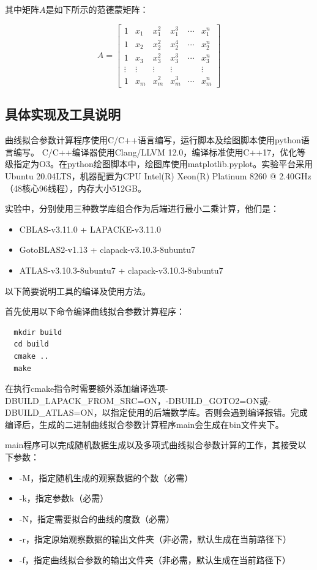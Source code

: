 \documentclass[a4paper]{article}
\begin{document}
其中矩阵$A$是如下所示的范德蒙矩阵：

\begin{equation*}
  A=
  \begin{bmatrix}
    1 & x_1 & x_1^2 & x_1^3 & \cdots & x_1^n \\
    1 & x_2 & x_2^2 & x_2^4 & \cdots & x_2^n \\
    1 & x_3 & x_3^2 & x_3^3 & \cdots & x_3^n \\
    \vdots & \vdots & \vdots & \vdots & & \vdots \\
    1 & x_m & x_m^2 &x_m^3 & \cdots & x_m^n
  \end{bmatrix}
\end{equation*}

\subsection{具体实现及工具说明}
曲线拟合参数计算程序使用C/C++语言编写，运行脚本及绘图脚本使用python语言编写。
C/C++编译器使用Clang/LLVM 12.0，编译标准使用C++17，优化等级指定为O3。在python绘图脚本中，绘图库使用matplotlib.pyplot。实验平台采用Ubuntu 20.04LTS，机器配置为CPU Intel(R) Xeon(R) Platinum 8260 @ 2.40GHz（48核心96线程），内存大小512GB。

实验中，分别使用三种数学库组合作为后端进行最小二乘计算，他们是：
\begin{itemize}
  \item CBLAS-v3.11.0 + LAPACKE-v3.11.0 
  \item GotoBLAS2-v1.13 + clapack-v3.10.3-8ubuntu7
  \item ATLAS-v3.10.3-8ubuntu7 + clapack-v3.10.3-8ubuntu7
\end{itemize}

以下简要说明工具的编译及使用方法。

首先使用以下命令编译曲线拟合参数计算程序：
\begin{lstlisting}
  mkdir build
  cd build
  cmake ..
  make   
\end{lstlisting}
在执行cmake指令时需要额外添加编译选项-DBUILD\_LAPACK\_FROM\_SRC=ON，-DBUILD\_GOTO2=ON或-DBUILD\_ATLAS=ON，以指定使用的后端数学库。否则会遇到编译报错。完成编译后，生成的二进制曲线拟合参数计算程序main会生成在bin文件夹下。

main程序可以完成随机数据生成以及多项式曲线拟合参数计算的工作，其接受以下参数：
\begin{itemize}
  \item -M，指定随机生成的观察数据的个数（必需）
  \item -k，指定参数k（必需）
  \item -N，指定需要拟合的曲线的度数（必需）
  \item -r，指定原始观察数据的输出文件夹（非必需，默认生成在当前路径下）
  \item -f，指定曲线拟合参数的输出文件夹（非必需，默认生成在当前路径下）
\end{itemize}
\end{document}
